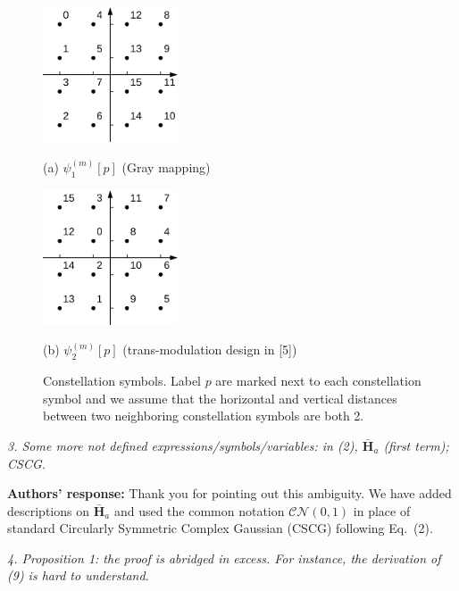 \documentclass[onecolumn, 11pt, draftclsnofoot]{IEEEtran}
\begin{document}
\begin{figure}[htb]
  \begin{minipage}[b]{0.48\linewidth}
    \centering
    \centerline{\includegraphics[width=4.0cm]{./figs/gray.eps}}
    \centerline{(a) $\psi_1^{(m)}[p]$ (Gray mapping)}\medskip
  \end{minipage}
  \hfill
  \begin{minipage}[b]{.48\linewidth}
    \centering
    \centerline{\includegraphics[width=4.0cm]{./figs/karim.eps}}
    \centerline{(b) $\psi_2^{(m)}[p]$ (trans-modulation design in [5])}\medskip
  \end{minipage}
  \caption{Constellation symbols. Label $p$ are marked next to each
  constellation symbol and we assume that the horizontal and vertical
  distances between two neighboring constellation symbols are both 2.}
  \label{fig:mapping}
\end{figure}
\vspace{0.5cm}

\noindent
\emph{3. Some more not defined expressions/symbols/variables: in (2),
$\bar{\mathbf{H}}_a$ (first term); CSCG.}

\noindent \textbf{Authors' response:}
Thank you for pointing out this ambiguity. We have added descriptions on
$\bar{\mathbf{H}}_a$ and used the common notation $\mathcal{CN}(0,1)$
in place of standard Circularly Symmetric Complex Gaussian (CSCG) following
Eq.~(2).

\vspace{0.5cm}

\noindent
\emph{4. Proposition 1: the proof is abridged in excess. For instance, the
derivation of (9) is hard to understand.}
\end{document}
